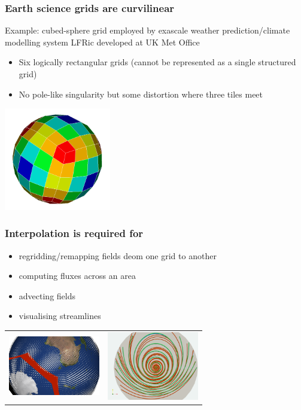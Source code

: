 \documentclass[aspectratio=169]{beamer}
\begin{document}
\begin{frame}[t]
  \frametitle{Earth science grids are curvilinear}
  \begin{block}{Example: cubed-sphere grid employed by exascale weather prediction/climate modelling system LFRic developed at UK Met Office}
    \begin{itemize}
      \item Six logically rectangular grids (cannot be represented as a single structured grid)
      \item No pole-like singularity but some distortion where three tiles meet 
    \end{itemize}
  \end{block}
  \begin{center}
    \includegraphics[width=0.35\textwidth]{cubedSphere.png}
  \end{center}
\end{frame}

\begin{frame}[t]
  \frametitle{Interpolation is required for}
  \begin{itemize}
   \item regridding/remapping fields deom one grid to another
   \item computing fluxes across an area
   \item advecting fields
   \item visualising streamlines
  \end{itemize}
    \begin{tabular}{lr}
      \includegraphics[width=40mm]{fluxIntegral.png} & 
      \includegraphics[width=40mm]{streamLineError.png} 
    \end{tabular}  
\end{frame}
\end{document}

